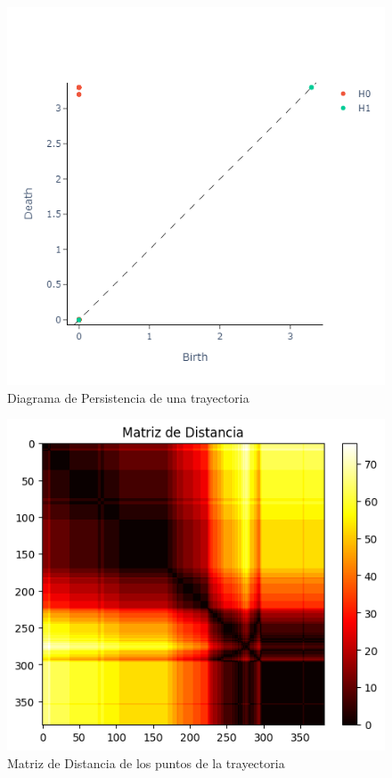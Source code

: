 \begin{figure}[htbp]
    \centering
    \includegraphics[width=0.7\linewidth]{images/persistencia_una.png}
    \caption{Diagrama de Persistencia de una trayectoria }
    \label{fig:pers_una}
\end{figure}

\begin{figure}[htbp]
    \centering
    \includegraphics[scale=0.75]{images/matriz.png}
    \caption{Matriz de Distancia de los puntos de la trayectoria}
    \label{fig:matriz}
\end{figure}

